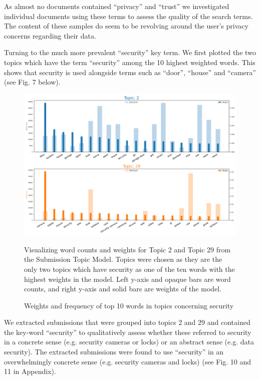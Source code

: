 \documentclass{article}
\begin{document}
    As almost no documents contained “privacy” and “trust” we investigated individual documents using these terms to assess the quality of the search terms. The content of these samples do seem to be revolving around the user’s privacy concerns regarding their data.
    
    Turning to the much more prevalent “security” key term. We first plotted the two topics which have the term “security” among the 10 highest weighted words. This shows that security is used alongside terms such as “door”, “house” and “camera” (see Fig. 7 below).
    
    \begin{figure}[H]
        \begin{centering}
        \includegraphics[width = \textwidth]{../Figure/H2_topic_weight_prelim.png}
        \caption{Weights and frequency of top 10 words in topics concerning security}
        \end{centering}
        \begin{footnotesize} 
            Visualizing word counts and weights for Topic 2 and Topic 29 from the Submission Topic Model. Topics were chosen as they are the only two topics which have security as one of the ten words with the highest weights in the model. Left y-axis and opaque bars are word counts, and right y-axis and solid bars are weights of the model. 
        \end{footnotesize}
    \end{figure}

    We extracted submissions that were grouped into topics 2 and 29 and contained the key-word “security” to qualitatively assess whether these referred to security in a concrete sense (e.g. security cameras or locks) or an abstract sense (e.g. data security). The extracted submissions were found to use “security” in an overwhelmingly concrete sense (e.g. security cameras and locks) (see Fig. 10 and 11 in Appendix). 
\end{document}
